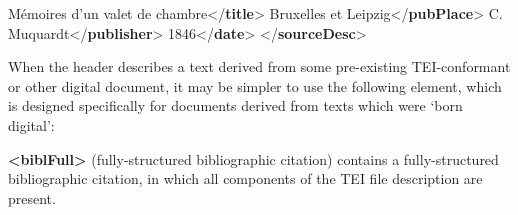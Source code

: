 \begin{shaded}
\hspace*{1em}\hspace*{1em}Mémoires d'un valet de chambre{</\textbf{title}>}\mbox{}\newline 
\hspace*{1em}\hspace*{1em}\mbox{}\newline 
\hspace*{1em}\hspace*{1em}\hspace*{1em}Bruxelles et Leipzig{</\textbf{pubPlace}>}\mbox{}\newline 
\hspace*{1em}\hspace*{1em}\hspace*{1em}C. Muquardt{</\textbf{publisher}>}\mbox{}\newline 
\hspace*{1em}\hspace*{1em}\hspace*{1em}1846{</\textbf{date}>}\mbox{}\newline 
\hspace*{1em}\hspace*{1em}\mbox{}\newline 
\hspace*{1em}\mbox{}\newline 
{}\mbox{}\newline 
{</\textbf{sourceDesc}>}\end{shaded}\egroup\par \par
When the header describes a text derived from some pre-existing TEI-conformant or other digital document, it may be simpler to use the following element, which is designed specifically for documents derived from texts which were ‘born digital’: 
\begin{sansreflist}
  
\item [\textbf{<biblFull>}] (fully-structured bibliographic citation) contains a fully-structured bibliographic citation, in which all components of the TEI file description are present.
\end{sansreflist}
